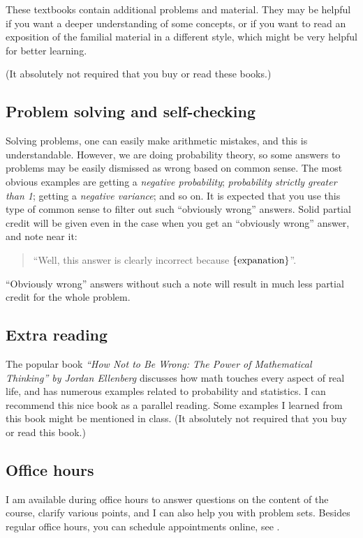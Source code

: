 \documentclass[oneside,11pt]{amsart}
\begin{document}
These textbooks contain additional problems and material.
They may be helpful if you want a deeper understanding of
some concepts, or if you want to read an exposition of the
familial material in a different style, which might be very
helpful for better learning.

(It absolutely not required that you buy or read these books.)

\subsection{Problem solving and self-checking}
\label{sub:problem_solving}

Solving problems, one can easily make arithmetic mistakes,
and this is understandable. However, 
we are doing probability theory, so some answers to problems
may be easily dismissed as wrong
based on common sense. 
The most obvious examples are 
getting a \emph{negative probability}; \emph{probability strictly greater than 1};
getting a \emph{negative variance}; and so on.
It is expected that you use this type of common sense to filter out 
such ``obviously wrong'' answers.
Solid partial credit will be given even in the case when you get an ``obviously
wrong'' answer, and note near it:
\begin{quote}
	``Well, this answer is clearly incorrect because $\{\textnormal{expanation}\}$''.
\end{quote}
``Obviously wrong'' answers without such a note 
will result in much less partial credit for the whole problem.

\subsection{Extra reading}

The popular book
\emph{``How Not to Be Wrong: The Power of Mathematical Thinking'' by Jordan Ellenberg}
discusses how math touches every aspect of real life, and has 
numerous examples related to probability and statistics. 
I can recommend this nice book as a parallel reading. Some
examples I learned from this book might be mentioned in class.
(It absolutely not required that you buy or read this book.)

\subsection{Office hours}

I am available during office hours to answer questions on the content of the 
course, clarify various points, and I can also help you with problem sets. 
Besides regular office hours, you can schedule appointments online, see 
.
\end{document}
